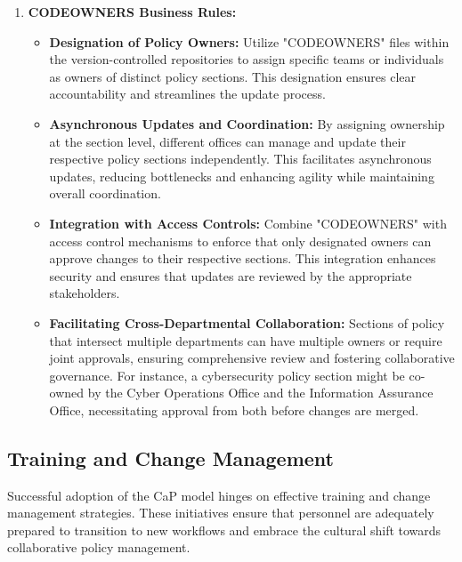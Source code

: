 \documentclass[11pt]{article}
\begin{document}
\begin{enumerate}
    \item \textbf{CODEOWNERS Business Rules:}
    \begin{itemize}
        \item \textbf{Designation of Policy Owners:} Utilize "CODEOWNERS" files within the version-controlled repositories to assign specific teams or individuals as owners of distinct policy sections. This designation ensures clear accountability and streamlines the update process.
        \item \textbf{Asynchronous Updates and Coordination:} By assigning ownership at the section level, different offices can manage and update their respective policy sections independently. This facilitates asynchronous updates, reducing bottlenecks and enhancing agility while maintaining overall coordination.
        \item \textbf{Integration with Access Controls:} Combine "CODEOWNERS" with access control mechanisms to enforce that only designated owners can approve changes to their respective sections. This integration enhances security and ensures that updates are reviewed by the appropriate stakeholders.
        \item \textbf{Facilitating Cross-Departmental Collaboration:} Sections of policy that intersect multiple departments can have multiple owners or require joint approvals, ensuring comprehensive review and fostering collaborative governance. For instance, a cybersecurity policy section might be co-owned by the Cyber Operations Office and the Information Assurance Office, necessitating approval from both before changes are merged.
    \end{itemize}
\end{enumerate}

\subsection{Training and Change Management}

Successful adoption of the CaP model hinges on effective training and change management strategies. These initiatives ensure that personnel are adequately prepared to transition to new workflows and embrace the cultural shift towards collaborative policy management.
\end{document}
